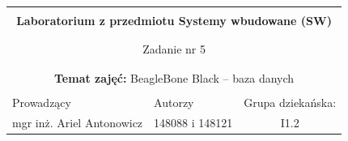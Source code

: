 \documentclass[polish,a4paper]{article}
\begin{document}
	\begin{center}
		\begin{tabular}{ p{} p{} p{} p{} p{} }

			&   &   &   &  \\
			\hline
			\multicolumn{5}{|c|}{}\\[-1ex]
			\multicolumn{5}{|c|}{{\LARGE \textbf{Laboratorium z przedmiotu Systemy wbudowane (SW)}}}\\
			\multicolumn{5}{|c|}{}\\[-1ex]
			\hline
			\hline

			\multicolumn{5}{|c|}{}\\[-1ex]
			\multicolumn{5}{|c|}{{\LARGE Zadanie nr 5}}\\
			\multicolumn{5}{|c|}{}\\[-1ex]
			\hline
			\hline

			\multicolumn{5}{|c|}{}\\[-1ex]
			\multicolumn{5}{|c|}{{\textbf{Temat zajęć:} BeagleBone Black – baza danych}}\\
			\multicolumn{5}{|c|}{}\\[-1ex]
			\hline
			\hline

			\multicolumn{1}{|l|}{Prowadzący} &
			\multicolumn{2}{|l|}{Autorzy} &
			\multicolumn{2}{|l|}{Grupa dziekańska:} \\
			\multicolumn{1}{|c|}{mgr inż. Ariel Antonowicz} &
			\multicolumn{2}{|c|}{148088 i 148121} &
			\multicolumn{2}{|c|}{I1.2} \\
			\hline
			\hline
		\end{tabular}
	\end{center}
    \[\,\]
\end{document}
